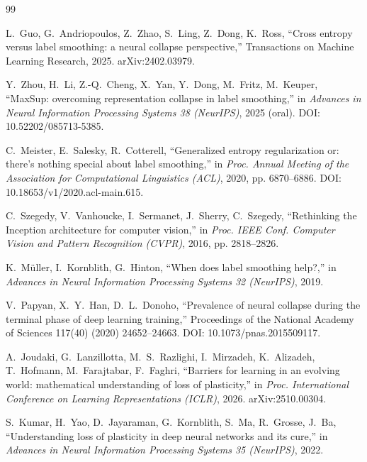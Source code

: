 \documentclass[review,12pt]{elsarticle}
\begin{document}
\begin{thebibliography}{99}

L.~Guo, G.~Andriopoulos, Z.~Zhao, S.~Ling, Z.~Dong, K.~Ross,
``Cross entropy versus label smoothing: a neural collapse perspective,''
Transactions on Machine Learning Research, 2025. arXiv:2402.03979.

Y.~Zhou, H.~Li, Z.-Q.~Cheng, X.~Yan, Y.~Dong, M.~Fritz, M.~Keuper,
``MaxSup: overcoming representation collapse in label smoothing,'' in
\emph{Advances in Neural Information Processing Systems 38 (NeurIPS)}, 2025
(oral). DOI: 10.52202/085713-5385.

C.~Meister, E.~Salesky, R.~Cotterell, ``Generalized entropy regularization
or: there's nothing special about label smoothing,'' in \emph{Proc. Annual
Meeting of the Association for Computational Linguistics (ACL)}, 2020,
pp. 6870--6886. DOI: 10.18653/v1/2020.acl-main.615.

C.~Szegedy, V.~Vanhoucke, I.~Sermanet, J.~Sherry, C.~Szegedy,
``Rethinking the Inception architecture for computer vision,'' in \emph{Proc.
IEEE Conf. Computer Vision and Pattern Recognition (CVPR)}, 2016,
pp. 2818--2826.

K.~M\"{u}ller, I.~Kornblith, G.~Hinton, ``When does label smoothing help?,''
in \emph{Advances in Neural Information Processing Systems 32 (NeurIPS)},
2019.

V.~Papyan, X.~Y.~Han, D.~L.~Donoho, ``Prevalence of neural collapse during
the terminal phase of deep learning training,''
Proceedings of the National Academy of Sciences 117(40) (2020) 24652--24663.
DOI: 10.1073/pnas.2015509117.

A.~Joudaki, G.~Lanzillotta, M.~S.~Razlighi, I.~Mirzadeh, K.~Alizadeh,
T.~Hofmann, M.~Farajtabar, F.~Faghri,
``Barriers for learning in an evolving world: mathematical understanding of
loss of plasticity,'' in \emph{Proc. International Conference on Learning
Representations (ICLR)}, 2026. arXiv:2510.00304.

S.~Kumar, H.~Yao, D.~Jayaraman, G.~Kornblith, S.~Ma, R.~Grosse, J.~Ba,
``Understanding loss of plasticity in deep neural networks and its cure,''
in \emph{Advances in Neural Information Processing Systems 35 (NeurIPS)},
2022.


\end{thebibliography}
\end{document}
